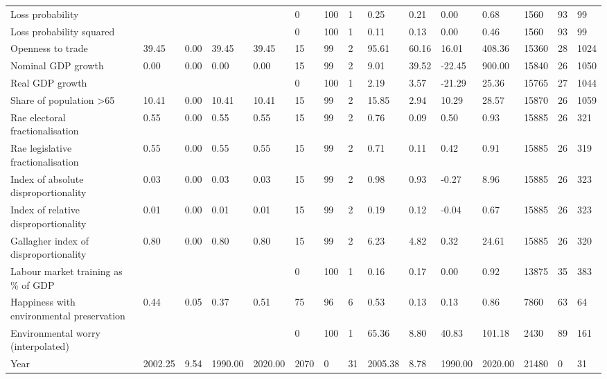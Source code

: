 \begin{longtable}{lllllllllllllll}
\addlinespace
Loss probability &  &  &  &  & 0 & 100 & 1 & 0.25 & 0.21 & 0.00 & 0.68 & 1560 & 93 & 99\\
Loss probability squared &  &  &  &  & 0 & 100 & 1 & 0.11 & 0.13 & 0.00 & 0.46 & 1560 & 93 & 99\\
Openness to trade & 39.45 & 0.00 & 39.45 & 39.45 & 15 & 99 & 2 & 95.61 & 60.16 & 16.01 & 408.36 & 15360 & 28 & 1024\\
Nominal GDP growth & 0.00 & 0.00 & 0.00 & 0.00 & 15 & 99 & 2 & 9.01 & 39.52 & -22.45 & 900.00 & 15840 & 26 & 1050\\
Real GDP growth &  &  &  &  & 0 & 100 & 1 & 2.19 & 3.57 & -21.29 & 25.36 & 15765 & 27 & 1044\\
\addlinespace
Share of population >65 & 10.41 & 0.00 & 10.41 & 10.41 & 15 & 99 & 2 & 15.85 & 2.94 & 10.29 & 28.57 & 15870 & 26 & 1059\\
Rae electoral fractionalisation & 0.55 & 0.00 & 0.55 & 0.55 & 15 & 99 & 2 & 0.76 & 0.09 & 0.50 & 0.93 & 15885 & 26 & 321\\
Rae legislative fractionalisation & 0.55 & 0.00 & 0.55 & 0.55 & 15 & 99 & 2 & 0.71 & 0.11 & 0.42 & 0.91 & 15885 & 26 & 319\\
Index of absolute disproportionality & 0.03 & 0.00 & 0.03 & 0.03 & 15 & 99 & 2 & 0.98 & 0.93 & -0.27 & 8.96 & 15885 & 26 & 323\\
Index of relative disproportionality & 0.01 & 0.00 & 0.01 & 0.01 & 15 & 99 & 2 & 0.19 & 0.12 & -0.04 & 0.67 & 15885 & 26 & 323\\
\addlinespace
Gallagher index of disproportionality & 0.80 & 0.00 & 0.80 & 0.80 & 15 & 99 & 2 & 6.23 & 4.82 & 0.32 & 24.61 & 15885 & 26 & 320\\
Labour market training as \% of GDP &  &  &  &  & 0 & 100 & 1 & 0.16 & 0.17 & 0.00 & 0.92 & 13875 & 35 & 383\\
Happiness with environmental preservation & 0.44 & 0.05 & 0.37 & 0.51 & 75 & 96 & 6 & 0.53 & 0.13 & 0.13 & 0.86 & 7860 & 63 & 64\\
Environmental worry (interpolated) &  &  &  &  & 0 & 100 & 1 & 65.36 & 8.80 & 40.83 & 101.18 & 2430 & 89 & 161\\
Year & 2002.25 & 9.54 & 1990.00 & 2020.00 & 2070 & 0 & 31 & 2005.38 & 8.78 & 1990.00 & 2020.00 & 21480 & 0 & 31\\
\bottomrule
\end{longtable}
